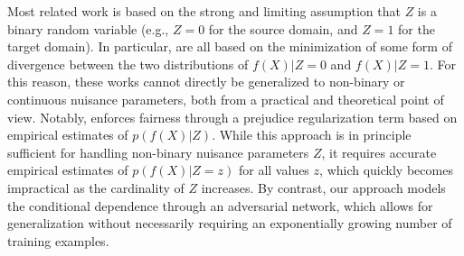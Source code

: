 \documentclass{article}
\theoremstyle{plain}
\begin{document}
Most related
work is based on the strong and limiting assumption that $Z$ is a binary
random variable (e.g., $Z=0$ for the source domain, and
$Z=1$ for the target domain). In particular, \citep{pan2011domain,gong2013connecting,baktashmotlagh2013unsupervised,zemel2013learning,ganin2014unsupervised,ajakan2014domain,EdwardsS15,louizos2015variational}
are all based on the minimization of some form of divergence between the two distributions of
$f(X)|Z=0$ and $f(X)|Z=1$. For this reason,
these works cannot directly be generalized to non-binary or
continuous nuisance parameters, both from a practical and theoretical point of view.
Notably, \cite{kamishima2012fairness} enforces fairness through
a prejudice regularization term based on empirical estimates of $p(f(X)|Z)$.
While this approach is in principle sufficient for handling non-binary
nuisance parameters $Z$, it requires accurate
empirical estimates of $p(f(X)|Z=z)$ for all values $z$, which quickly becomes
impractical as the cardinality of $Z$ increases. By contrast, our approach models the conditional
dependence through an adversarial network, which allows for generalization without
necessarily requiring an exponentially growing number of training examples.
\end{document}
